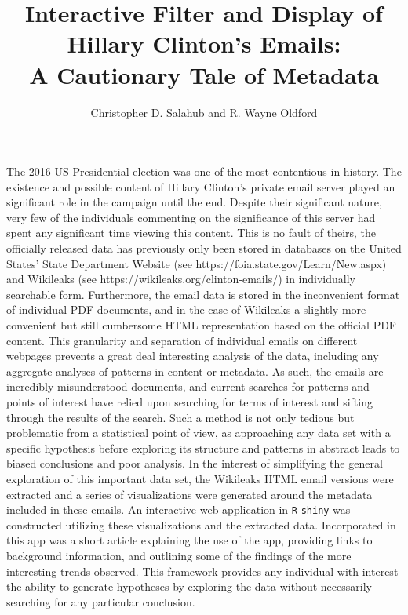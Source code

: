 \documentclass[journal]{vgtc}                %
\title{Interactive Filter and Display of Hillary Clinton's Emails: \\A Cautionary Tale of Metadata}
\author{Christopher D. Salahub and R. Wayne Oldford}
\begin{document}

\maketitle


The 2016 US Presidential election was one of the most contentious in history.  The existence and possible content of Hillary Clinton's private email server played an significant role in the campaign until the end. Despite their significant nature, very few of the individuals commenting on the significance of this server had spent any significant time viewing this content. This is no fault of theirs, the officially released data has previously only been stored in databases on the United States' State Department Website (see https://foia.state.gov/Learn/New.aspx) and Wikileaks (see https://wikileaks.org/clinton-emails/) in individually searchable form. Furthermore, the email data is stored in the inconvenient format of individual PDF documents, and in the case of Wikileaks a slightly more convenient but still cumbersome HTML representation based on the official PDF content. This granularity and separation of individual emails on different webpages prevents a great deal interesting analysis of the data, including any aggregate analyses of patterns in content or metadata. As such, the emails are incredibly misunderstood documents, and current searches for patterns and points of interest have relied upon searching for terms of interest and sifting through the results of the search. Such a method is not only tedious but problematic from a statistical point of view, as approaching any data set with a specific hypothesis before exploring its structure and patterns in abstract leads to biased conclusions and poor analysis. In the interest of simplifying the general exploration of this important data set, the Wikileaks HTML email versions were extracted and a series of visualizations were generated around the metadata included in these emails. An interactive web application in \texttt{R} \texttt{shiny} was constructed utilizing these visualizations and the extracted data. Incorporated in this app was a short article explaining the use of the app, providing links to background information, and outlining some of the findings of the more interesting trends observed. This framework provides any individual with interest the ability to generate hypotheses by exploring the data without necessarily searching for any particular conclusion. 
\end{document}
